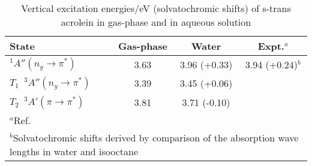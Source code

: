 \begin{table} [h]
\begin{center}
\caption{\label{tab:acrol-water}\small{Vertical excitation energies/eV (solvatochromic shifts) 
of s-trans acrolein in gas-phase and in aqueous solution }} 
\begin{tabular}{lccc}
\\\hline\hline
State & Gas-phase & Water  &   Expt.$^a$ \\
\hline\hline
$^1A''(n_y\rightarrow\pi^*)$         & 3.63 & 3.96 (+0.33) & 3.94 (+0.24)$^b$  \\
$T_1$\ $^3A''(n_y\rightarrow\pi^*)$  & 3.39 & 3.45 (+0.06) & \\
$T_2$\ $^3A'(\pi\rightarrow\pi^*)$   & 3.81 & 3.71 (-0.10) & \\
\hline\hline
\multicolumn{4}{l}{\scriptsize{$^a$Ref.\cite{Forbes:59} }}\\
\multicolumn{4}{l}{\scriptsize{$^b$Solvatochromic shifts derived by comparison of the
absorption wave lengths in water and isooctane}}
\end{tabular}
\end{center}
\end{table}




                   
